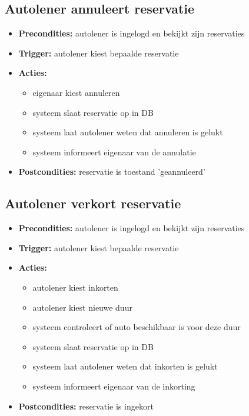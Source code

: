 \documentclass[]{article}
\begin{document}
\subsection{Autolener annuleert reservatie}
\begin{itemize}
\item \textbf{Precondities:} autolener is ingelogd en bekijkt zijn reservaties \item \textbf{Trigger:} autolener kiest bepaalde reservatie
\item \textbf{Acties:} \begin{itemize}
\item	eigenaar kiest annuleren
\item	systeem slaat reservatie op in DB
\item      systeem laat autolener weten dat annuleren is gelukt
\item      systeem informeert eigenaar van de annulatie
\end{itemize}
\item \textbf{Postcondities:} reservatie is toestand 'geannuleerd'
\end{itemize}

\subsection{Autolener verkort reservatie}
\begin{itemize}
\item \textbf{Precondities:} autolener is ingelogd en bekijkt zijn reservaties \item \textbf{Trigger:} autolener kiest bepaalde reservatie
\item \textbf{Acties:} \begin{itemize}
\item	autolener kiest inkorten
\item	autolener kiest nieuwe duur
\item	systeem controleert of auto beschikbaar is voor deze duur
\item	systeem slaat reservatie op in DB
\item      systeem laat autolener weten dat inkorten is gelukt
\item      systeem informeert eigenaar van de inkorting
\end{itemize}
\item \textbf{Postcondities:} reservatie is ingekort
\end{itemize}
\end{document}
